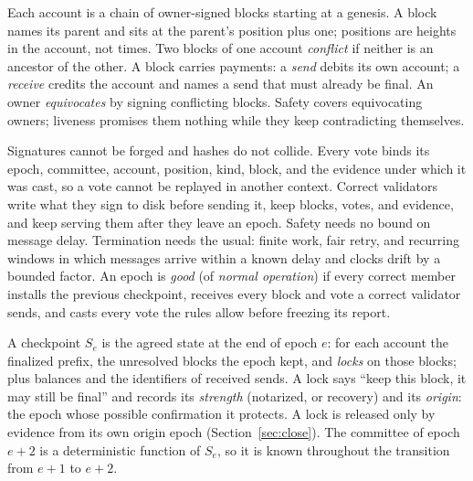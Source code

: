 Each account is a chain of owner-signed blocks starting at a genesis. A block names its parent and sits at the parent's position plus one; positions are heights in the account, not times. Two blocks of one account \emph{conflict} if neither is an ancestor of the other. A block carries payments: a \emph{send} debits its own account; a \emph{receive} credits the account and names a send that must already be final. An owner \emph{equivocates} by signing conflicting blocks. Safety covers equivocating owners; liveness promises them nothing while they keep contradicting themselves.

Signatures cannot be forged and hashes do not collide. Every vote binds its epoch, committee, account, position, kind, block, and the evidence under which it was cast, so a vote cannot be replayed in another context. Correct validators write what they sign to disk before sending it, keep blocks, votes, and evidence, and keep serving them after they leave an epoch. Safety needs no bound on message delay. Termination needs the usual: finite work, fair retry, and recurring windows in which messages arrive within a known delay and clocks drift by a bounded factor. An epoch is \emph{good} (of \emph{normal operation}) if every correct member installs the previous checkpoint, receives every block and vote a correct validator sends, and casts every vote the rules allow before freezing its report.

A checkpoint $S_e$ is the agreed state at the end of epoch $e$: for each account the finalized prefix, the unresolved blocks the epoch kept, and \emph{locks} on those blocks; plus balances and the identifiers of received sends. A lock says ``keep this block, it may still be final'' and records its \emph{strength} (notarized, or recovery) and its \emph{origin}: the epoch whose possible confirmation it protects. A lock is released only by evidence from its own origin epoch (Section~\ref{sec:close}). The committee of epoch $e+2$ is a deterministic function of $S_e$, so it is known throughout the transition from $e+1$ to $e+2$.

